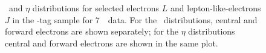 \begin{figure}[h!]
{        }
    \caption[\pt\ and $\eta$ distributions for selected electrons $L$ and
    lepton-like-electrons $J$ in the \Z-tag sample for 7~\tev\ data.]
    {\pt\ and $\eta$ distributions for selected electrons $L$ and
    lepton-like-electrons $J$ in the \Z-tag sample for 7~\tev\ data. 
    For the \pt\ distributions, central and forward electrons are shown
    separately; for the $\eta$ distributions central and forward electrons are
    shown in the same plot.}
\label{fig:ljdist-el-seven} 
\end{figure}

